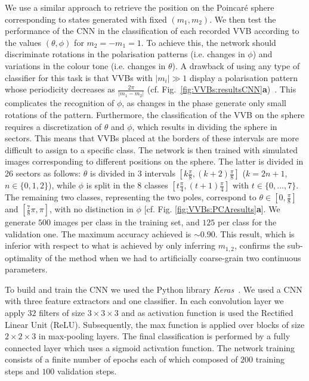 We use a similar approach to retrieve the position on the Poincaré sphere corresponding to states generated with fixed $(m_1,m_2)$.
We then test the performance of the CNN in the classification of each recorded VVB according to the values $(\theta,\phi)$ for $m_2=-m_1=1$.
To achieve this, the network should discriminate rotations in the polarisation patterns (i.e. changes in $\phi$) and variations in the colour tone (i.e. changes in $\theta$). A drawback of using any type of classifier for this task is that VVBs with $|m_i|\gg1$ display a polarisation pattern whose periodicity decreases as $\frac{2\pi}{|m_1-m_2|}$ (cf. Fig.~\mbox{\ref{fig:VVBs:resultsCNN}}{\bf a})~\cite{fickler2012quantum,dambrosio2013photonic}.
This complicates the recognition of $\phi$, as changes in the phase generate only small rotations of the pattern.
Furthermore, the classification of the VVB on the sphere requires a discretization of $\theta$ and $\phi$, which results in dividing the sphere in sectors. This means that VVBs placed at the borders of these intervals are more difficult to assign to a specific class.
The network is then trained with simulated images corresponding to different positions on the sphere. 
The latter is divided in 26 sectors as follows: $\theta$ is divided in $3$ intervals $\left[k \frac{\pi}{8}, (k+2) \frac{\pi}{8}\right]$ ($k=2n+1$, $n \in \{0,1,2\}$), while $\phi$ is split in the 8 classes $\left[t \frac{\pi}{4}, (t+1) \frac{\pi}{4}\right]$ with $t \in \{0,...,7\} $. The remaining two classes, representing the two poles, correspond to $\theta \in \left[0, \frac{\pi}{8}\right]$ and $ \left[ \frac{7}{8} \pi, \pi\right]$, with no distinction in $\phi$ [cf. Fig. \ref{fig:VVBs:PCAresults}{\bf a}].
We generate $500$ images per class in the training set, and $125$ per class for the validation one. The maximum accuracy  achieved is $\sim 0.90$. This result, which is inferior with respect to what is achieved by only inferring $m_{1,2}$,  confirms the sub-optimality of the method when we had to artificially coarse-grain two continuous parameters.

To build and train the \ac{CNN} we used the Python library \emph{Keras}~\cite{chollet2015keras}.
We used a CNN with three feature extractors and one classifier. In each convolution layer we apply $32$ filters of size $3 \times 3 \times 3$ and as activation function is used the Rectified Linear Unit (ReLU). Subsequently, the max function is applied over blocks of size $2 \times 2 \times 3$  in max-pooling layers. %
The final classification is performed by a fully connected layer which uses a sigmoid activation function. The network training consists of a finite number of epochs each of which composed of $200$ training steps and $100$ validation steps. 


